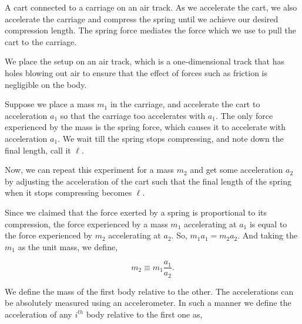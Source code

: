 \begin{marginfigure}
\caption{A cart connected to a carriage on an air track. As we
accelerate the cart, we also accelerate the carriage and compress
the spring until we achieve our desired compression length. The spring force mediates the force
which we use to pull the cart to the carriage.}
\end{marginfigure}

We place the setup on an air track, which is a one-dimensional track 
that has holes blowing out air to ensure that the effect of forces such 
as friction is negligible on the body.

Suppose we place a mass $m_1$ in the carriage, and accelerate the cart 
to acceleration $a_1$ so that the carriage too accelerates with $a_1$. 
The only force experienced by the mass is the spring force, which causes 
it to accelerate with acceleration $a_1$. We wait till the spring stops 
compressing, and note down the final length, call it $\ell$.

Now, we can repeat this experiment for a mass $m_2$ and get some 
acceleration $a_2$ by adjusting the acceleration of the cart such that 
the final length of the spring when it stops compressing becomes $\ell$.

Since we claimed that the force exerted by a spring is proportional to 
its compression, the force experienced by a mass $m_1$ accelerating at 
$a_1$ is equal to the force experienced by $m_2$ accelerating at $a_2$. 
So, $m_1 a_1 = m_2 a_2$. And taking the $m_1$ as the unit mass, we define,

\[
m_2 \equiv m_1 \frac{a_1}{a_2}.
\]

We define the mass of the first body relative to the other. The 
accelerations can be absolutely measured using an accelerometer. In such 
a manner we define the acceleration of any $i^{th}$ body relative to the 
first one as,

